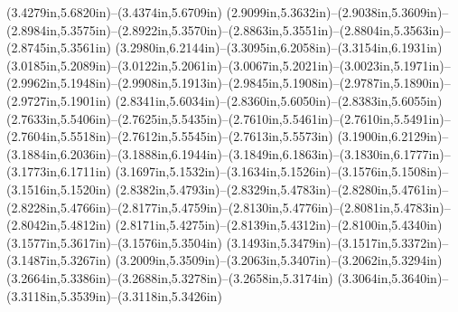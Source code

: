 (3.4279in,5.6820in)--(3.4374in,5.6709in) (2.9099in,5.3632in)--(2.9038in,5.3609in)--(2.8984in,5.3575in)--(2.8922in,5.3570in)--(2.8863in,5.3551in)--(2.8804in,5.3563in)--(2.8745in,5.3561in) (3.2980in,6.2144in)--(3.3095in,6.2058in)--(3.3154in,6.1931in) (3.0185in,5.2089in)--(3.0122in,5.2061in)--(3.0067in,5.2021in)--(3.0023in,5.1971in)--(2.9962in,5.1948in)--(2.9908in,5.1913in)--(2.9845in,5.1908in)--(2.9787in,5.1890in)--(2.9727in,5.1901in) (2.8341in,5.6034in)--(2.8360in,5.6050in)--(2.8383in,5.6055in) (2.7633in,5.5406in)--(2.7625in,5.5435in)--(2.7610in,5.5461in)--(2.7610in,5.5491in)--(2.7604in,5.5518in)--(2.7612in,5.5545in)--(2.7613in,5.5573in) (3.1900in,6.2129in)--(3.1884in,6.2036in)--(3.1888in,6.1944in)--(3.1849in,6.1863in)--(3.1830in,6.1777in)--(3.1773in,6.1711in) (3.1697in,5.1532in)--(3.1634in,5.1526in)--(3.1576in,5.1508in)--(3.1516in,5.1520in) (2.8382in,5.4793in)--(2.8329in,5.4783in)--(2.8280in,5.4761in)--(2.8228in,5.4766in)--(2.8177in,5.4759in)--(2.8130in,5.4776in)--(2.8081in,5.4783in)--(2.8042in,5.4812in) (2.8171in,5.4275in)--(2.8139in,5.4312in)--(2.8100in,5.4340in) (3.1577in,5.3617in)--(3.1576in,5.3504in) (3.1493in,5.3479in)--(3.1517in,5.3372in)--(3.1487in,5.3267in) (3.2009in,5.3509in)--(3.2063in,5.3407in)--(3.2062in,5.3294in) (3.2664in,5.3386in)--(3.2688in,5.3278in)--(3.2658in,5.3174in) (3.3064in,5.3640in)--(3.3118in,5.3539in)--(3.3118in,5.3426in)
